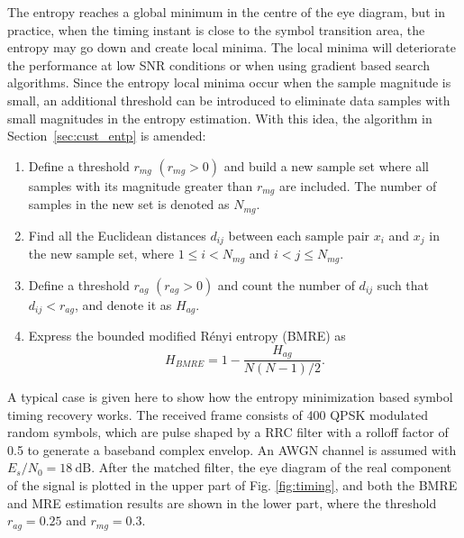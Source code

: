 \documentclass[journal,comsoc, onecolumn, 12pt,draftclsnofoot]{IEEEtran} %
\begin{document}
The entropy reaches a global minimum in the centre of the eye diagram, but in practice, when the timing instant is close to the symbol transition area, the entropy may go down and create local minima. 
The local minima will deteriorate the performance at low SNR conditions or when using gradient based search algorithms.
Since the entropy local minima occur when the sample magnitude is small, an additional threshold can be introduced to eliminate data samples with small magnitudes in the entropy estimation.
With this idea, the algorithm in Section~\ref{sec:cust_entp} is amended:

\begin{enumerate}
\item Define a threshold \(r_{mg}\) \((r_{mg}>0)\) and build a new sample set where all samples with its magnitude greater than \(r_{mg}\) are included.
The number of samples in the new set is denoted as \(N_{mg}\).
\item Find all the Euclidean distances \(d_{ij}\) between each sample pair \(x_i\) and \(x_j\) in the new sample set, where \(1\le i<N_{mg}\) and \( i<j \le N_{mg}\). 
\item Define a threshold \(r_{ag}\) \((r_{ag}>0)\) and count the number of \(d_{ij}\) such that $d_{ij}<r_{ag}$, and denote it as $H_{ag}$.
\item Express the bounded modified R\'enyi entropy (BMRE) as
\begin{equation}
H_{BMRE}= 1- \frac{ H_{ag}}{ N(N-1)/2}.
\label{eq:entorpy_ad2}
\end{equation}
\end{enumerate}



A typical case is given here to show how the entropy minimization based symbol timing recovery works.
The received frame consists of 400 QPSK modulated random symbols, 
which are pulse shaped by a RRC filter with a rolloff factor of 0.5 to generate a baseband complex envelop.
An AWGN channel is assumed with $E_s/N_0 = 18~\text{dB}$. 
After the matched filter, the eye diagram of the real component of the signal is plotted in the upper part of Fig. \ref{fig:timing}, and both the BMRE and MRE estimation results are shown in the lower part,
where the threshold $r_{ag}=0.25$ and \(r_{mg}=0.3\).
\end{document}
